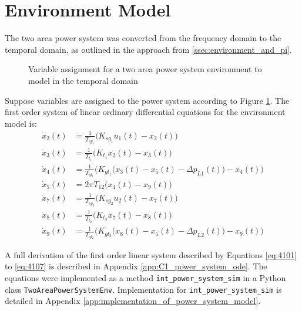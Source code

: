\section{Environment Model} \label{ssec:env_modelling}
The two area power system was converted from the frequency domain to the temporal domain, as outlined in the approach from \textsection \ref{ssec:environment_and_pi}.

\begin{figure}[h]
	\centering
	\resizebox{\textwidth}{!}{}
	\caption[Two-area power system ODE derivation]{Variable assignment for a two area power system environment to model in the temporal domain}
	\label{4101_two_area_power_system_temporal_model}
\end{figure}

Suppose variables are assigned to the power system according to Figure \ref{4101_two_area_power_system_temporal_model}. The first order system of linear ordinary differential equations for the environment model is:
\begin{align}
	\dot{x}_2(t) &= \frac{1}{T_{sg_1}}\big( K_{sg_1} u_1(t) - x_2(t) \big) \label{eq:4101} \\
	\dot{x}_3(t) &= \frac{1}{T_{t_1}} \big( K_{t_1} x_2(t) - x_3(t) \big) \label{eq:4102} \\
	\dot{x}_4(t) &= \frac{1}{T_{gl_1}} \bigg( K_{gl_1} \big( x_3(t) - x_5(t) - \Delta p_{L1}(t) \big) - x_4(t) \bigg) \label{eq:4103}  \\
	\dot{x}_5(t) &= 2 \pi T_{12} \big( x_4(t) - x_9(t) \big) \label{eq:4104} \\
	\dot{x}_7(t) &= \frac{1}{T_{sg_2}}\big( K_{sg_2} u_2(t) - x_7(t) \big) \label{eq:4105} \\
	\dot{x}_8(t) &= \frac{1}{T_{t_2}} \big( K_{t_2} x_7(t) - x_8(t) \big) \label{eq:4106} \\
	\dot{x}_9(t) &= \frac{1}{T_{gl_2}} \bigg( K_{gl_2} \big( x_8(t) - x_5(t) - \Delta p_{L2}(t) \big) - x_9(t) \bigg) \label{eq:4107}
\end{align}

A full derivation of the first order linear system described by Equations \ref{eq:4101} to \ref{eq:4107} is described in Appendix \ref{app:C1_power_system_ode}. The equations were implemented as a method \verb|int_power_system_sim| in a Python class \verb|TwoAreaPowerSystemEnv|. Implementation for \verb|int_power_system_sim| is detailed in Appendix \ref{app:implementation_of_power_system_model}.

